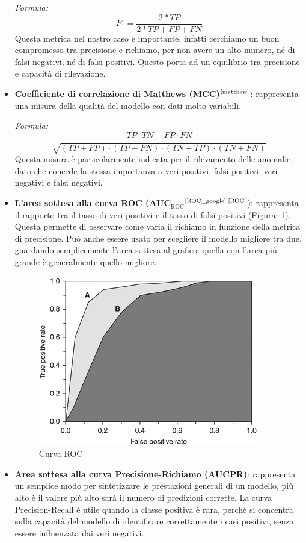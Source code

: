 \begin{itemize}
    \textit{Formula:}
    \begin{equation}
        F_1=\frac{2*TP}{2*TP+FP+FN}
    \end{equation}
    Questa metrica nel nostro caso è importante, infatti cerchiamo un buon compromesso tra precisione e richiamo, per non avere un alto numero, né di falsi negativi, né di falsi positivi. Questo porta ad un equilibrio tra precisione e capacità di rilevazione.

    \item \textbf{Coefficiente di correlazione di Matthews (MCC)}$^{\text{\cite{matthew}}}$: rappresenta una misura della qualità del modello con dati molto variabili.

    \textit{Formula:}
    \begin{equation}
        \frac{TP\cdot TN-FP\cdot FN}{\sqrt{(TP+FP)\cdot (TP+FN)\cdot(TN+TP)\cdot(TN+FN)}}    
    \end{equation}
    Questa misura è particolarmente indicata per il rilevamento delle anomalie, dato che concede la stessa importanza a veri positivi, falsi positivi, veri negativi e falsi negativi.

    \item \textbf{L'area sottesa alla curva ROC (AUC$_\text{ROC}$}$^{\text{\cite{ROC_google}}}$$^{\text{\cite{ROC}}}$): rappresenta il rapporto tra il tasso di veri positivi e il tasso di falsi positivi (Figura: \ref{fig:Curva ROC}).
    Questa permette di osservare come varia il richiamo in funzione della metrica di precisione. Può anche essere usato per scegliere il modello migliore tra due, guardando semplicemente l'area sottesa al grafico: quella con l'area più grande è generalmente quello migliore.

    \begin{figure}
        \centering
        \includegraphics[width=0.5\linewidth]{images//Capitolo3/Curva ROC.png}
        \caption{Curva ROC}
        \label{fig:Curva ROC}
    \end{figure}
    
    \item \textbf{Area sottesa alla curva Precisione-Richiamo (AUC\textunderscore PR)}: rappresenta un semplice modo per sintetizzare le prestazioni generali di un modello, più alto è il valore più alto sarà il numero di predizioni corrette. La curva Precision-Recall è utile quando la classe positiva è rara, perché si concentra sulla capacità del modello di identificare correttamente i casi positivi, senza essere influenzata dai veri negativi.
\end{itemize}
